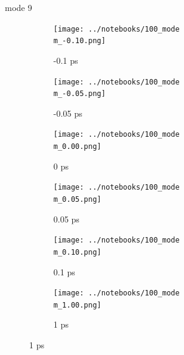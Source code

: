 \documentclass{beamer}
\begin{document}
\renewcommand\m{9}
\begin{frame}{mode \m}
	\begin{figure}
		\centering
		\begin{subfigure}[b]{\w\textwidth}
			\centering
			\texttt{[image: ../notebooks/100\_mode\\m\_-0.10.png]}
			\caption{-0.1 ps}
		\end{subfigure}
		\begin{subfigure}[b]{\w\textwidth}
			\centering
			\texttt{[image: ../notebooks/100\_mode\\m\_-0.05.png]}
			\caption{-0.05 ps}
		\end{subfigure}
		\begin{subfigure}[b]{\w\textwidth}
			\centering
			\texttt{[image: ../notebooks/100\_mode\\m\_0.00.png]}
			\caption{0 ps}
		\end{subfigure}
		\begin{subfigure}[b]{\w\textwidth}
			\centering
			\texttt{[image: ../notebooks/100\_mode\\m\_0.05.png]}
			\caption{0.05 ps}
		\end{subfigure}
		\begin{subfigure}[b]{\w\textwidth}
			\centering
			\texttt{[image: ../notebooks/100\_mode\\m\_0.10.png]}
			\caption{0.1 ps}
		\end{subfigure}
		\begin{subfigure}[b]{\w\textwidth}
			\centering
			\texttt{[image: ../notebooks/100\_mode\\m\_1.00.png]}
			\caption{1 ps}
		\end{subfigure}
	\end{figure}
\end{frame}
\end{document}
